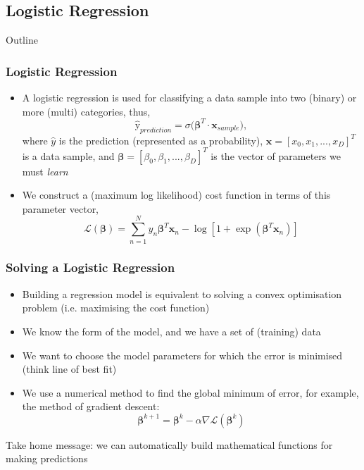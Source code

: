 \documentclass{beamer}
\begin{document}
\subsection{Logistic Regression}


\begin{frame}[noframenumbering]{Outline}
\tableofcontents[currentsubsection]
\end{frame}


\begin{frame}
\frametitle{Logistic Regression}
\begin{itemize}
\item A logistic regression is used for classifying a data sample into two (binary) or more (multi) categories, thus,
$$\hat{\text{y}}_{prediction} = \sigma\big(\boldsymbol\beta^{T} \cdot \boldsymbol{x}_{sample}\big),$$
where $\hat{y}$ is the prediction (represented as a probability), $\boldsymbol{x} = [x_0, x_1, ..., x_D]^T$ is a data sample, and $\boldsymbol\beta = [\beta_0, \beta_1, ..., \beta_D]^T$ is the vector of parameters we must \emph{learn}
\item We construct a (maximum log likelihood) cost function in terms of this parameter vector,
$$\mathcal{L}(\boldsymbol\beta) = \sum_{n=1}^N y_n\boldsymbol\beta^T\boldsymbol{x}_n - \log[1 + \exp(\boldsymbol\beta^T\boldsymbol{x}_n)]$$
\end{itemize}
\end{frame}


\begin{frame}
\frametitle{Solving a Logistic Regression}\begin{itemize}
\item Building a regression model is equivalent to solving a convex optimisation problem (i.e. maximising the cost function)
\item We know the form of the model, and we have a set of (training) data
\item We want to choose the model parameters for which the error is minimised (think line of best fit)
\item We use a numerical method to find the global minimum of error, for example, the method of gradient descent:
$$\boldsymbol\beta^{k+1} = \boldsymbol\beta^{k} - \alpha\nabla\mathcal{L}(\boldsymbol\beta^{k})$$
\end{itemize}
Take home message: we can automatically build mathematical functions for making predictions
\end{frame}
\end{document}
